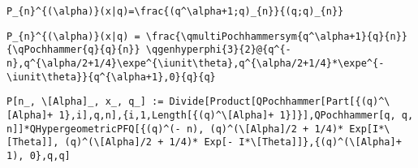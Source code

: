 \newsavebox\DGMM
\begin{lrbox}{\DGMM}
 \begin{minipage}[t]{0.82\textwidth}
  \lstinline[language={[latex]TeX},mathescape,breaklines=true]""
 \end{minipage}
\end{lrbox}
\newsavebox\DGMA
\begin{lrbox}{\DGMA}
 \begin{minipage}[t]{0.82\textwidth}
  \lstinline[language={[latex]TeX},mathescape,breaklines=true]""
 \end{minipage}
\end{lrbox}
\newsavebox\DHT
\begin{lrbox}{\DHT}
 \begin{minipage}[t]{0.82\textwidth}
  \lstinline[language={[latex]TeX},mathescape,breaklines=true]"P_{n}^{(\alpha)}(x|q)=\frac{(q^\alpha+1;q)_{n}}{(q;q)_{n}}"
 \end{minipage}
\end{lrbox}
\newsavebox\DHST
\begin{lrbox}{\DHST}
 \begin{minipage}[t]{0.82\textwidth}
  \lstinline[language={[latex]TeX},mathescape,breaklines=true]"P_{n}^{(\alpha)}(x|q) = \frac{\qmultiPochhammersym{q^\alpha+1}{q}{n}}{\qPochhammer{q}{q}{n}} \qgenhyperphi{3}{2}@{q^{-n},q^{\alpha/2+1/4}\expe^{\iunit\theta},q^{\alpha/2+1/4}*\expe^{-\iunit\theta}}{q^{\alpha+1},0}{q}{q}"
 \end{minipage}
\end{lrbox}
\newsavebox\DHMM
\begin{lrbox}{\DHMM}
 \begin{minipage}[t]{0.82\textwidth}
  \lstinline[language={[latex]TeX},mathescape,breaklines=true]"P[n_, \[Alpha]_, x_, q_] := Divide[Product[QPochhammer[Part[{(q)^\[Alpha]+ 1},i],q,n],{i,1,Length[{(q)^\[Alpha]+ 1}]}],QPochhammer[q, q, n]]*QHypergeometricPFQ[{(q)^(- n), (q)^(\[Alpha]/2 + 1/4)* Exp[I*\[Theta]], (q)^(\[Alpha]/2 + 1/4)* Exp[- I*\[Theta]]},{(q)^(\[Alpha]+ 1), 0},q,q]"
 \end{minipage}
\end{lrbox}
\newsavebox\DHMA
\begin{lrbox}{\DHMA}
 \begin{minipage}[t]{0.82\textwidth}
  \lstinline[language={[latex]TeX},mathescape,breaklines=true]""
 \end{minipage}
\end{lrbox}
